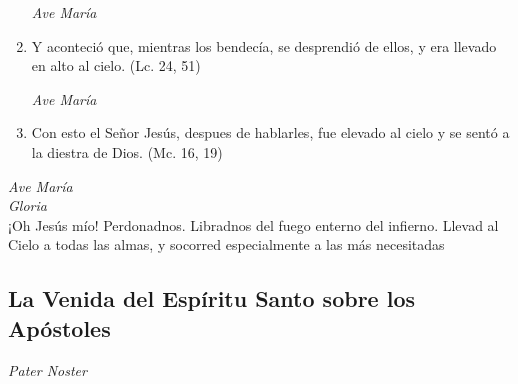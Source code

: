 \documentclass[a4paper,11pt, oneside]{report}
\begin{document}
\begin{enumerate}
        \textit{Ave María}

        \item Y aconteció que, mientras los bendecía, se desprendió de ellos, y era llevado en alto al cielo. (Lc. 24, 51)

        \textit{Ave María}

        \item Con esto el Señor Jesús, despues de hablarles, fue elevado al cielo y se sentó a la diestra de Dios. (Mc. 16, 19)

      \end{enumerate}

      \textit{Ave María} \\
      \indent\textit{Gloria} \\
      \indent¡Oh Jesús mío! Perdonadnos. Libradnos del fuego enterno del infierno. Llevad al Cielo a todas las almas, y socorred especialmente a las más 
      necesitadas

    \subsection*{ La Venida del Espíritu Santo sobre los Apóstoles }

      \textit{Pater Noster}
\end{document}
